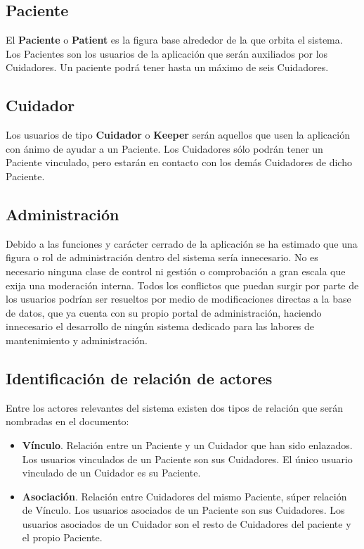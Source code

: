 \subsection{Paciente}
El \textbf{Paciente} o \textbf{Patient} es la figura base alrededor de la que orbita el sistema. Los Pacientes son los usuarios de la aplicación que serán auxiliados por los Cuidadores. Un paciente podrá tener hasta un máximo de seis Cuidadores.

\subsection{Cuidador}
\label{sec:Cuidador}

Los usuarios de tipo \textbf{Cuidador} o \textbf{Keeper} serán aquellos que usen la aplicación con ánimo de ayudar a un Paciente. Los Cuidadores sólo podrán tener un Paciente vinculado, pero estarán en contacto con los demás Cuidadores de dicho Paciente. 

\subsection{Administración}

Debido a las funciones y carácter cerrado de la aplicación se ha estimado que una figura o rol de administración dentro del sistema sería innecesario. No es necesario ninguna clase de control ni gestión o comprobación a gran escala que exija una moderación interna. Todos los conflictos que puedan surgir por parte de los usuarios podrían ser resueltos por medio de modificaciones directas a la base de datos, que ya cuenta con su propio portal de administración, haciendo innecesario el desarrollo de ningún sistema dedicado para las labores de mantenimiento y administración.

\subsection{Identificación de relación de actores}

Entre los actores relevantes del sistema existen dos tipos de relación que serán nombradas en el documento:

\begin{itemize}
    \item \textbf{Vínculo}. Relación entre un Paciente y un Cuidador que han sido enlazados. Los usuarios vinculados de un Paciente son sus Cuidadores. El único usuario vinculado de un Cuidador es su Paciente.
    \item \textbf{Asociación}. Relación entre Cuidadores del mismo Paciente, súper relación de Vínculo. Los usuarios asociados de un Paciente son sus Cuidadores. Los usuarios asociados de un Cuidador son el resto de Cuidadores del paciente y el propio Paciente.
\end{itemize}